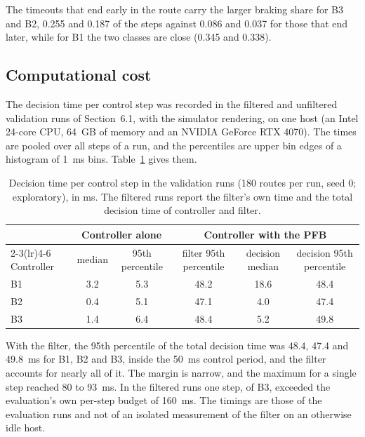 The timeouts that end early in the route carry the larger braking share for B3 and B2, 0.255 and 0.187 of the steps against 0.086 and 0.037 for those that end later, while for B1 the two classes are close (0.345 and 0.338).

\subsection{Computational cost}

The decision time per control step was recorded in the filtered and unfiltered validation runs of Section~6.1, with the simulator rendering, on one host (an Intel 24-core CPU, 64~GB of memory and an NVIDIA GeForce RTX 4070). The times are pooled over all steps of a run, and the percentiles are upper bin edges of a histogram of 1~ms bins. Table~\ref{tab:compute} gives them.

\begin{table}[t]
\caption{Decision time per control step in the validation runs (180 routes per run, seed 0; exploratory), in ms. The filtered runs report the filter's own time and the total decision time of controller and filter.}
\label{tab:compute}
\centering
\small
\setlength{\tabcolsep}{4pt}
\begin{tabular}{lccccc}
\toprule
 & \multicolumn{2}{c}{Controller alone} & \multicolumn{3}{c}{Controller with the PFB} \\
\cmidrule(lr){2-3}\cmidrule(lr){4-6}
Controller & median & 95th percentile & filter 95th percentile & decision median & decision 95th percentile \\
\midrule
B1 & 3.2 & 5.3 & 48.2 & 18.6 & 48.4 \\
B2 & 0.4 & 5.1 & 47.1 & 4.0 & 47.4 \\
B3 & 1.4 & 6.4 & 48.4 & 5.2 & 49.8 \\
\bottomrule
\end{tabular}
\end{table}

With the filter, the 95th percentile of the total decision time was 48.4, 47.4 and 49.8~ms for B1, B2 and B3, inside the 50~ms control period, and the filter accounts for nearly all of it. The margin is narrow, and the maximum for a single step reached 80 to 93~ms. In the filtered runs one step, of B3, exceeded the evaluation's own per-step budget of 160~ms. The timings are those of the evaluation runs and not of an isolated measurement of the filter on an otherwise idle host.
